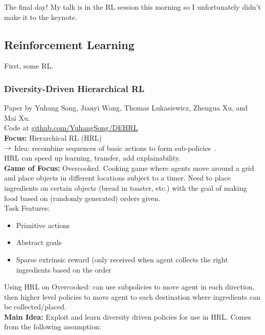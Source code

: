 The final day! My talk is in the RL session this morning so I unfortunately didn't make it to the keynote.

\subsection{Reinforcement Learning}

First, some RL.

\subsubsection{Diversity-Driven Hierarchical RL~\cite{song2018diversity}}

Paper by Yuhang Song, Jianyi Wang, Thomas Lukasiewicz, Zhengua Xu, and Mai Xu. \\

Code at \url{github.com/YuhangSong/DEHRL} \\

{\bf Focus:} Hierarchical RL (HRL) \\

$\rightarrow$ Idea: recombine sequences of basic actions to form sub-policies~\cite{sutton1999between}. \\

HRL can speed up learning, transfer, add explainability. \\

{\bf Game of Focus:} Overcooked. Cooking game where agents move around a grid and place objects in different locations subject to a timer. Need to place ingredients on certain objects (bread in toaster, etc.) with the goal of making food based on (randomly generated) orders given. \\

Task Features:
\begin{itemize}
    \item Primitive actions
    \item Abstract goals
    \item Sparse extrinsic reward (only received when agent collects the right ingredients based on the order
\end{itemize}

Using HRL on Overcooked: can use subpolicies to move agent in each direction, then higher level policies to move agent to each destination where ingredients can be collected/placed. \\

{\bf Main Idea:} Exploit and learn diversity driven policies for use in HRL. Comes from the following assumption:

